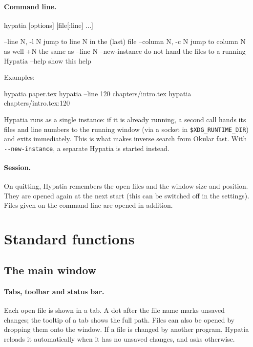 \documentclass[11pt]{article}
\begin{document}
    \paragraph{Command line.}
    \begin{Code}
hypatia [options] [file[:line] ...]

  --line N, -l N     jump to line N in the (last) file
  --column N, -c N   jump to column N as well
  +N                 the same as --line N
  --new-instance     do not hand the files to a running Hypatia
  --help             show this help
    \end{Code}
    Examples:
    \begin{Code}
hypatia paper.tex
hypatia --line 120 chapters/intro.tex
hypatia chapters/intro.tex:120
    \end{Code}

    Hypatia runs as a single instance: if it is already running, a second call hands its files and line numbers to the running window (via a socket in \verb+$XDG_RUNTIME_DIR+) and exits immediately. This is what makes inverse search from Okular fast. With \verb+--new-instance+, a separate Hypatia is started instead.

    \paragraph{Session.} On quitting, Hypatia remembers the open files and the window size and position. They are opened again at the next start (this can be switched off in the settings). Files given on the command line are opened in addition.

    \section{Standard functions}

    \subsection{The main window}

    \paragraph{Tabs, toolbar and status bar.} Each open file is shown in a tab. A dot after the file name marks unsaved changes; the tooltip of a tab shows the full path. Files can also be opened by dropping them onto the window. If a file is changed by another program, Hypatia reloads it automatically when it has no unsaved changes, and asks otherwise.
\end{document}
